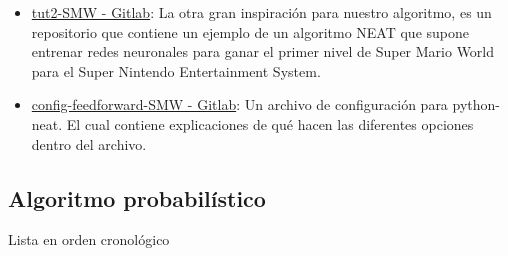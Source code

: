 \documentclass{article}
\begin{document}
\begin{itemize}
  \item \href{https://gitlab.com/lucasrthompson/Sonic-Bot-In-OpenAI-and-NEAT/-/blob/master/tut2-SMW.py}{tut2-SMW - Gitlab}: La otra gran inspiración para nuestro algoritmo, es un repositorio que contiene un ejemplo de un algoritmo NEAT que supone entrenar redes neuronales para ganar el primer nivel de Super Mario World para el Super Nintendo Entertainment System.
  \item \href{https://gitlab.com/lucasrthompson/Sonic-Bot-In-OpenAI-and-NEAT/-/blob/master/config-feedfoward-SMW}{config-feedforward-SMW - Gitlab}: Un archivo de configuración para python-neat. El cual contiene explicaciones de qué hacen las diferentes opciones dentro del archivo.
\end{itemize}

\subsection{Algoritmo probabilístico}
Lista en orden cronológico
\end{document}
